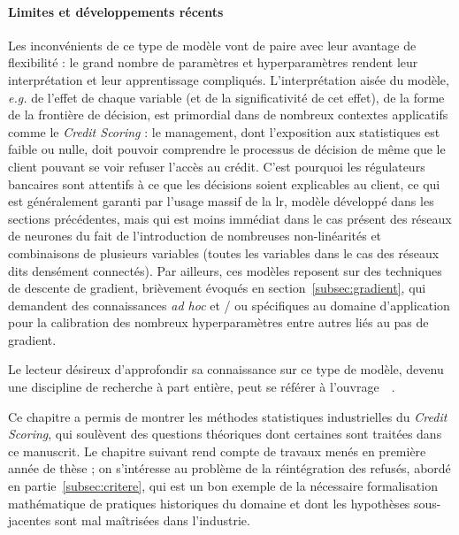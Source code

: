 \paragraph{Limites et développements récents}

Les inconvénients de ce type de modèle vont de paire avec leur avantage de flexibilité : le grand nombre de paramètres et hyperparamètres rendent leur interprétation et leur apprentissage compliqués. L'interprétation aisée du modèle, \textit{e.g.} de l'effet de chaque variable (et de la significativité de cet effet), de la forme de la frontière de décision, est primordial dans de nombreux contextes applicatifs comme le \textit{Credit Scoring} : le management, dont l'exposition aux statistiques est faible ou nulle, doit pouvoir comprendre le processus de décision de même que le client pouvant se voir refuser l'accès au crédit. C'est pourquoi les régulateurs bancaires sont attentifs à ce que les décisions soient explicables au client, ce qui est généralement garanti par l'usage massif de la \gls{lr}, modèle développé dans les sections précédentes, mais qui est moins immédiat dans le cas présent des réseaux de neurones du fait de l'introduction de nombreuses non-linéarités et combinaisons de plusieurs variables (toutes les variables dans le cas des réseaux dits densément connectés). Par ailleurs, ces modèles reposent sur des techniques de descente de gradient, brièvement évoqués en section~\ref{subsec:gradient}, qui demandent des connaissances \textit{ad hoc} et / ou spécifiques au domaine d'application pour la calibration des nombreux hyperparamètres entre autres liés au pas de gradient.

Le lecteur désireux d'approfondir sa connaissance sur ce type de modèle, devenu une discipline de recherche à part entière, peut se référer à l'ouvrage~~\cite{goodfellow2016deep}.


\bigskip

Ce chapitre a permis de montrer les méthodes statistiques industrielles du \textit{Credit Scoring}, qui soulèvent des questions théoriques dont certaines sont traitées dans ce manuscrit. Le chapitre suivant rend compte de travaux menés en première année de thèse ; on s'intéresse au problème de la réintégration des refusés, abordé en partie~\ref{subsec:critere}, qui est un bon exemple de la nécessaire formalisation mathématique de pratiques historiques du domaine et dont les hypothèses sous-jacentes sont mal maîtrisées dans l'industrie.


\printbibliography[heading=subbibliography, title=Références du chapitre 1]